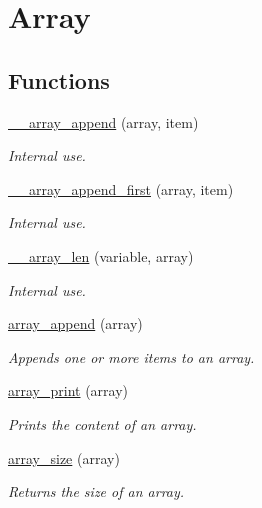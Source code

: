 \hypertarget{group__array}{}\section{Array}
\label{group__array}
\subsection*{Functions}
\begin{DoxyCompactItemize}
\item 
\hyperlink{group__array_gac1b58f87f18e51bccf0da88bb38a5254}{\+\_\+\+\_\+array\+\_\+append} (array, item)
\begin{DoxyCompactList}\small\item\em Internal use. \end{DoxyCompactList}\item 
\hyperlink{group__array_ga3b7dcece91caedf4e175177904b54b5d}{\+\_\+\+\_\+array\+\_\+append\+\_\+first} (array, item)
\begin{DoxyCompactList}\small\item\em Internal use. \end{DoxyCompactList}\item 
\hyperlink{group__array_gace906062785f41cb3c5d3eb8e791ece7}{\+\_\+\+\_\+array\+\_\+len} (variable, array)
\begin{DoxyCompactList}\small\item\em Internal use. \end{DoxyCompactList}\item 
\hyperlink{group__array_gaee08f787b133a7f4203367622b6f8b9b}{array\+\_\+append} (array)
\begin{DoxyCompactList}\small\item\em Appends one or more items to an array. \end{DoxyCompactList}\item 
\hyperlink{group__array_gabeb6fdf4a20b660e7690df808ed1a213}{array\+\_\+print} (array)
\begin{DoxyCompactList}\small\item\em Prints the content of an array. \end{DoxyCompactList}\item 
\hyperlink{group__array_ga06f72437a7b990eca354502b6c628bb9}{array\+\_\+size} (array)
\begin{DoxyCompactList}\small\item\em Returns the size of an array. \end{DoxyCompactList}\end{DoxyCompactItemize}


